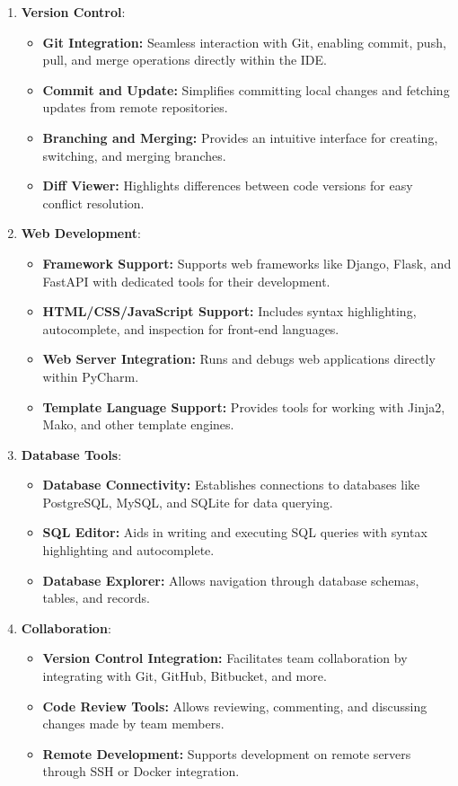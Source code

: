 \begin{enumerate}
	\item \textbf{Version Control}:
	\begin{itemize}
		\item \textbf{Git Integration:} Seamless interaction with Git, enabling commit, push, pull, and merge operations directly within the IDE.
		\item \textbf{Commit and Update:} Simplifies committing local changes and fetching updates from remote repositories.
		\item \textbf{Branching and Merging:} Provides an intuitive interface for creating, switching, and merging branches.
		\item \textbf{Diff Viewer:} Highlights differences between code versions for easy conflict resolution.
	\end{itemize}
	
	\item \textbf{Web Development}:
	\begin{itemize}
		\item \textbf{Framework Support:} Supports web frameworks like Django, Flask, and FastAPI with dedicated tools for their development.
		\item \textbf{HTML/CSS/JavaScript Support:} Includes syntax highlighting, autocomplete, and inspection for front-end languages.
		\item \textbf{Web Server Integration:} Runs and debugs web applications directly within PyCharm.
		\item \textbf{Template Language Support:} Provides tools for working with Jinja2, Mako, and other template engines.
	\end{itemize}
	
	\item \textbf{Database Tools}:
	\begin{itemize}
		\item \textbf{Database Connectivity:} Establishes connections to databases like PostgreSQL, MySQL, and SQLite for data querying.
		\item \textbf{SQL Editor:} Aids in writing and executing SQL queries with syntax highlighting and autocomplete.
		\item \textbf{Database Explorer:} Allows navigation through database schemas, tables, and records.
	\end{itemize}
	
	\item \textbf{Collaboration}:
	\begin{itemize}
		\item \textbf{Version Control Integration:} Facilitates team collaboration by integrating with Git, GitHub, Bitbucket, and more.
		\item \textbf{Code Review Tools:} Allows reviewing, commenting, and discussing changes made by team members.
		\item \textbf{Remote Development:} Supports development on remote servers through SSH or Docker integration.
	\end{itemize}
\end{enumerate}

